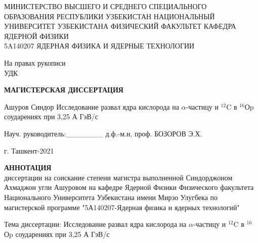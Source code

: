 \documentclass[fontsize=14pt]{scrarticle}
\begin{document}
	\begin{titlepage}
		\begin{center}
			\vspace{0.25cm}
        \large 	МИНИСТЕРСТВО ВЫСШЕГО И СРЕДНЕГО СПЕЦИАЛЬНОГО ОБРАЗОВАНИЯ РЕСПУБЛИКИ УЗБЕКИСТАН НАЦИОНАЛЬНЫЙ  УНИВЕРСИТЕТ УЗБЕКИСТАНА ФИЗИЧЕСКИЙ ФАКУЛЬТЕТ КАФЕДРА ЯДЕРНОЙ ФИЗИКИ\\  5A140207 ЯДЕРНАЯ ФИЗИКА И ЯДЕРНЫЕ ТЕХНОЛОГИИ	
			
			\begin{flushright}
			\small{На правах рукописи}\\
           \small{ УДК \ \ \ \ \ \ \ \ \ \ \ }
			\end{flushright}
			\vfill
			
			\large \textbf{МАГИСТЕРСКАЯ ДИССЕРТАЦИЯ }
			
			Ашуров Синдор
			\vfill
			{\large Исследование развал ядра кислорода на $\alpha$-частицу и $^{12}$C в $^{16}$Оp соударениях при 3,25 А ГэВ/с\\
			}
			\bigskip
		\end{center}

         
         \vfill
         
         \begin{flushleft}

Науч. руководитель:\_\_\_\_\_\_\_ д.ф.-м.н, проф. БОЗОРОВ Э.Х.
         \end{flushleft}
		\vfill
		
		\vfill
		\begin{center}
			г. Ташкент-2021
		\end{center}
	\end{titlepage}
	\newpage
	\makenomenclature 
	\renewcommand{\nomname}{Перечень условных обозначений}
    \newcommand*{\nom}[2]{#1\nomenclature{#1}{#2}}
	\printnomenclature[5em]
	\newpage
	\renewcommand{\contentsname}{Содержание}

	\thispagestyle{plain}
\begin{center}
    \large
    \textbf{АННОТАЦИЯ}\\
        диссертации на соискание степени магистра 
        выполненной Синдорджоном Ахмаджон угли Ашуровом на кафедре Ядерной Физики Физического факультета Национального Университета Узбекистана имени Мирзо Улугбека по магистерской программе "5А140207-Ядерная физика и ядерных технологий"
    \vspace{0.4cm}
    
   Тема диссертации: Исследование развал ядра кислорода на $\alpha$-частицу и $^{12}$C в $^{16}$Оp соударениях при 3,25 А ГэВ/с
        
    \vspace{0.4cm}
\end{center}
	
\end{document}
